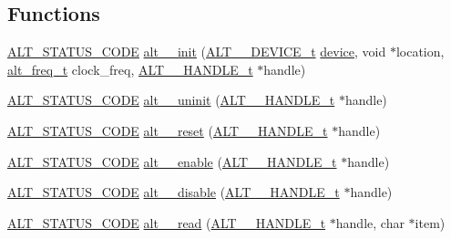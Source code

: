 \subsection*{Functions}
\begin{DoxyCompactItemize}
\item 
\mbox{\hyperlink{hwlib_8h_abdb0d369f069723ca55d6c94bcaaaa12}{A\+L\+T\+\_\+\+S\+T\+A\+T\+U\+S\+\_\+\+C\+O\+DE}} \mbox{\hyperlink{group__UART__BASIC_gaabd5c547f257e38f90ee210febd4348b}{alt\+\_\+\_\+init}} (\mbox{\hyperlink{group__UART__BASIC_ga292038e1b11e0a1f05df98abd20c819b}{A\+L\+T\+\_\+\_\+\+D\+E\+V\+I\+C\+E\+\_\+t}} \mbox{\hyperlink{structdevice}{device}}, void $\ast$location, \mbox{\hyperlink{group__CLK__MGR_gaa32fe6dfaa6def16098e0039eb336383}{alt\+\_\+freq\+\_\+t}} clock\+\_\+freq, \mbox{\hyperlink{group__UART__BASIC_ga4173f362f19fc04032c3859b78d78119}{A\+L\+T\+\_\+\_\+\+H\+A\+N\+D\+L\+E\+\_\+t}} $\ast$handle)
\item 
\mbox{\hyperlink{hwlib_8h_abdb0d369f069723ca55d6c94bcaaaa12}{A\+L\+T\+\_\+\+S\+T\+A\+T\+U\+S\+\_\+\+C\+O\+DE}} \mbox{\hyperlink{group__UART__BASIC_ga58b1878dbb4dbf38bba4da52ab4d9480}{alt\+\_\+\_\+uninit}} (\mbox{\hyperlink{group__UART__BASIC_ga4173f362f19fc04032c3859b78d78119}{A\+L\+T\+\_\+\_\+\+H\+A\+N\+D\+L\+E\+\_\+t}} $\ast$handle)
\item 
\mbox{\hyperlink{hwlib_8h_abdb0d369f069723ca55d6c94bcaaaa12}{A\+L\+T\+\_\+\+S\+T\+A\+T\+U\+S\+\_\+\+C\+O\+DE}} \mbox{\hyperlink{group__UART__BASIC_gad94c73d9f525761b4fcc3129fe08680b}{alt\+\_\+\_\+reset}} (\mbox{\hyperlink{group__UART__BASIC_ga4173f362f19fc04032c3859b78d78119}{A\+L\+T\+\_\+\_\+\+H\+A\+N\+D\+L\+E\+\_\+t}} $\ast$handle)
\item 
\mbox{\hyperlink{hwlib_8h_abdb0d369f069723ca55d6c94bcaaaa12}{A\+L\+T\+\_\+\+S\+T\+A\+T\+U\+S\+\_\+\+C\+O\+DE}} \mbox{\hyperlink{group__UART__BASIC_gab7d4f69d1a4d5862955a77a4032013f7}{alt\+\_\+\_\+enable}} (\mbox{\hyperlink{group__UART__BASIC_ga4173f362f19fc04032c3859b78d78119}{A\+L\+T\+\_\+\_\+\+H\+A\+N\+D\+L\+E\+\_\+t}} $\ast$handle)
\item 
\mbox{\hyperlink{hwlib_8h_abdb0d369f069723ca55d6c94bcaaaa12}{A\+L\+T\+\_\+\+S\+T\+A\+T\+U\+S\+\_\+\+C\+O\+DE}} \mbox{\hyperlink{group__UART__BASIC_ga35a81e69ac72ace9a1dd61901774b904}{alt\+\_\+\_\+disable}} (\mbox{\hyperlink{group__UART__BASIC_ga4173f362f19fc04032c3859b78d78119}{A\+L\+T\+\_\+\_\+\+H\+A\+N\+D\+L\+E\+\_\+t}} $\ast$handle)
\item 
\mbox{\hyperlink{hwlib_8h_abdb0d369f069723ca55d6c94bcaaaa12}{A\+L\+T\+\_\+\+S\+T\+A\+T\+U\+S\+\_\+\+C\+O\+DE}} \mbox{\hyperlink{group__UART__BASIC_ga0124c84775e913daec8eec21ffcef4df}{alt\+\_\+\_\+read}} (\mbox{\hyperlink{group__UART__BASIC_ga4173f362f19fc04032c3859b78d78119}{A\+L\+T\+\_\+\_\+\+H\+A\+N\+D\+L\+E\+\_\+t}} $\ast$handle, char $\ast$item)

\end{DoxyCompactItemize}
